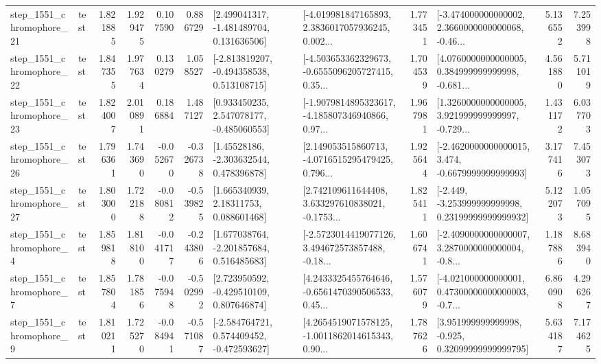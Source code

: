 \begin{tabular}{llrrrrllrlrr}
 step\_1551\_chromophore\_21 &      test &      1.821885 &    1.929475 &      0.107590 &  0.886729 &    [2.499041317, -1.481489704, 0.131636506] &  [-4.019981847165893, 2.3836017057936245, 0.002... &       1.773451 &  [-3.474000000000002, 2.3660000000000068, -0.46... &            5.136552 &          7.253998 \\
 step\_1551\_chromophore\_22 &      test &      1.847355 &    1.977634 &      0.130279 &  1.058527 &   [-2.813819207, -0.494358538, 0.513108715] &  [-4.503653362329673, -0.6555096205727415, 0.35... &       1.704539 &  [4.0760000000000005, 0.384999999999998, -0.681... &            4.561880 &          5.711019 \\
 step\_1551\_chromophore\_23 &      test &      1.824007 &    2.010891 &      0.186884 &  1.487127 &    [0.933450235, 2.547078177, -0.485060553] &  [-1.9079814895323617, -4.185807346940866, 0.97... &       1.967981 &  [1.3260000000000005, 3.921999999999997, -0.729... &            1.431172 &          6.037703 \\
 step\_1551\_chromophore\_26 &      test &      1.796361 &    1.743690 &     -0.052670 & -0.326738 &     [1.45528186, -2.303632544, 0.478396878] &  [2.149053515860713, -4.0716515295479425, 0.796... &       1.925644 &  [-2.4620000000000015, 3.474, -0.6679999999999993] &            3.177416 &          7.453073 \\
 step\_1551\_chromophore\_27 &      test &      1.803000 &    1.722188 &     -0.080812 & -0.539825 &      [1.665340939, 2.18311753, 0.088601468] &  [2.742109611644408, 3.633297610838021, -0.1753... &       1.825411 &  [-2.449, -3.253999999999998, 0.23199999999999932] &            5.122073 &          1.057095 \\
  step\_1551\_chromophore\_4 &      test &      1.859818 &    1.818100 &     -0.041717 & -0.243806 &    [1.677038764, -2.201857684, 0.516485683] &  [-2.5723014419077126, 3.494672573857488, -0.18... &       1.606741 &  [-2.4090000000000007, 3.2870000000000004, -0.8... &            1.187886 &          8.683940 \\
  step\_1551\_chromophore\_7 &      test &      1.857804 &    1.781856 &     -0.075948 & -0.502992 &    [2.723950592, -0.429510109, 0.807646874] &  [4.2433325455764646, -0.6561470390506533, 0.45... &       1.576079 &  [-4.021000000000001, 0.47300000000000003, -0.7... &            6.860908 &          4.296267 \\
  step\_1551\_chromophore\_9 &      test &      1.810211 &    1.725270 &     -0.084941 & -0.571087 &   [-2.584764721, 0.574409452, -0.472593627] &  [4.2654519071578125, -1.0011862014615343, 0.90... &       1.787626 &   [3.951999999999998, -0.925, 0.32099999999999795] &            5.634187 &          7.174625 \\

\end{tabular}
